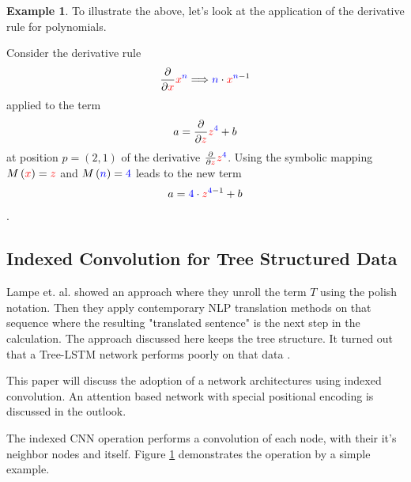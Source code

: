 \documentclass{scrartcl}
\theoremstyle{definition}
\newtheorem{exmp}{Example}[section]
\begin{document}
\begin{exmp}
To illustrate the above, let's look at the application of the derivative rule for polynomials.

Consider the derivative rule
\begin{align}
	\frac{\partial}{\partial {\color{red}x}} {\color{red}x}^{\color{blue}n} \Longrightarrow {\color{blue}n}\cdot {\color{red}x}^{{\color{blue}n}-1} 
\end{align}
applied to the term
\begin{align}
	a = \frac{\partial}{\partial {\color{red}z}} {\color{red}z}^{\color{blue}4} + b
\end{align}
at position $p=\left(2,1\right)$ of the derivative $\frac{\partial}{\partial {\color{red}z}} {\color{red}z}^{\color{blue}4}$.
Using the symbolic mapping $M\left({\color{red}x}\right) = \color{red}z$ and $M\left({\color{blue}n} \right) = {\color{blue}4}$ leads to the new term
\begin{align}
	a = {\color{blue}4}\cdot {\color{red}z}^{{\color{blue}4}-1} + b
\end{align}.

\end{exmp}

\subsection{Indexed Convolution for Tree Structured Data}

Lampe et. al. showed an approach where they unroll the term $T$ using the polish notation.
Then they apply contemporary NLP translation methods on that sequence where the resulting "translated sentence" is the next step in the calculation. \cite{Lample2020Deep}
The approach discussed here keeps the tree structure.
It turned out that a Tree-LSTM network performs poorly on that data \cite{tai2015improved}.

This paper will discuss the adoption of a network architectures using indexed convolution.
An attention based network with special positional encoding is discussed in the outlook. 


The indexed CNN operation performs a convolution of each node, with their it's neighbor nodes and itself.
Figure \ref{fig:index_tensor} demonstrates the operation by a simple example.

\begin{figure}[!htbp]
	\centering
	
	\label{fig:index_tensor}
\end{figure}
\end{document}
